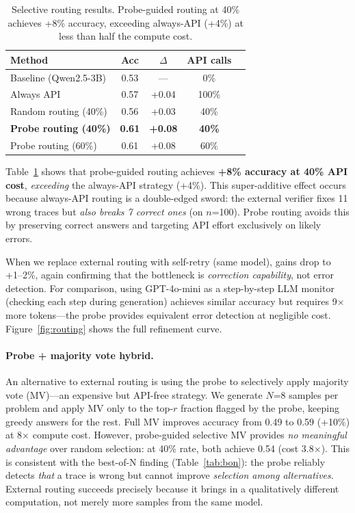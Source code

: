 \documentclass[11pt]{article}
\newcommand{\modelsmall}{Qwen2.5-3B}
\begin{document}
\begin{table}[t]
\centering
\small
\begin{tabular}{lcccc}
\toprule
\textbf{Method} & \textbf{Acc} & \textbf{$\Delta$} & \textbf{API calls} \\
\midrule
Baseline (\modelsmall) & 0.53 & --- & 0\% \\
Always API & 0.57 & +0.04 & 100\% \\
Random routing (40\%) & 0.56 & +0.03 & 40\% \\
\textbf{Probe routing (40\%)} & \textbf{0.61} & \textbf{+0.08} & \textbf{40\%} \\
Probe routing (60\%) & 0.61 & +0.08 & 60\% \\
\bottomrule
\end{tabular}
\caption{Selective routing results. Probe-guided routing at 40\% achieves +8\% accuracy, exceeding always-API (+4\%) at less than half the compute cost.}
\label{tab:routing}
\end{table}

Table~\ref{tab:routing} shows that probe-guided routing achieves \textbf{+8\% accuracy at 40\% API cost}, \textit{exceeding} the always-API strategy (+4\%).
This super-additive effect occurs because always-API routing is a double-edged sword: the external verifier fixes 11 wrong traces but \textit{also breaks 7 correct ones} (on $n$=100).
Probe routing avoids this by preserving correct answers and targeting API effort exclusively on likely errors.

When we replace external routing with self-retry (same model), gains drop to +1--2\%, again confirming that the bottleneck is \textit{correction capability}, not error detection.
For comparison, using GPT-4o-mini as a step-by-step LLM monitor (checking each step during generation) achieves similar accuracy but requires 9$\times$ more tokens---the probe provides equivalent error detection at negligible cost.
Figure~\ref{fig:routing} shows the full refinement curve.

\paragraph{Probe + majority vote hybrid.}
An alternative to external routing is using the probe to selectively apply majority vote (MV)---an expensive but API-free strategy.
We generate $N$=8 samples per problem and apply MV only to the top-$r$ fraction flagged by the probe, keeping greedy answers for the rest.
Full MV improves accuracy from 0.49 to 0.59 (+10\%) at 8$\times$ compute cost.
However, probe-guided selective MV provides \textit{no meaningful advantage} over random selection: at 40\% rate, both achieve 0.54 (cost 3.8$\times$).
This is consistent with the best-of-N finding (Table~\ref{tab:bon}): the probe reliably detects \textit{that} a trace is wrong but cannot improve \textit{selection among alternatives}.
External routing succeeds precisely because it brings in a qualitatively different computation, not merely more samples from the same model.
\end{document}
